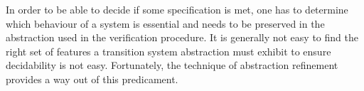 In order to be able to decide if some specification is met, one has to determine which behaviour of a system is essential and needs to be preserved in the abstraction used in the verification procedure.
It is generally not easy to find the right set of features a transition system abstraction must exhibit to ensure decidability is not easy.
Fortunately, the technique of abstraction refinement provides a way out of this predicament.


